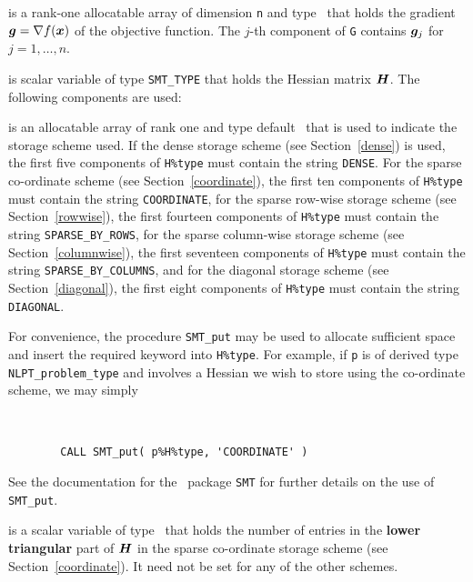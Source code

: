 \documentclass{galahad}
\newcommand{\Grad}{\nabla}
\begin{document}
\begin{description}
\begin{description}
 is a rank-one allocatable array of dimension {\tt n} and type 
\realdp\ that holds the gradient $\bmg = \Grad f(\bmx)$ 
of the objective function.
The $j$-th component of 
{\tt G} contains ${\bm{g}}_{j}$ for $j = 1, \ldots, n$.

\end{description}

 is scalar variable of type {\tt SMT\_TYPE} 
that holds the Hessian matrix ${\bm{H}}$. The following components
are used:

\begin{description}

 is an allocatable array of rank one and type default 
\character\ that
is used to indicate the storage scheme used. If the dense storage scheme 
(see Section~\ref{dense}) is used, 
the first five components of {\tt H\%type} must contain the
string {\tt DENSE}.
For the sparse co-ordinate scheme (see Section~\ref{coordinate}), 
the first ten components of {\tt H\%type} must contain the
string {\tt COORDINATE},  
for the sparse row-wise storage scheme (see Section~\ref{rowwise}),
the first fourteen components of {\tt H\%type} must contain the
string {\tt SPARSE\_BY\_ROWS},
for the sparse column-wise storage scheme (see Section~\ref{columnwise}),
the first seventeen components of {\tt H\%type} must contain the
string {\tt SPARSE\_BY\_COLUMNS},
and for the diagonal storage scheme (see Section~\ref{diagonal}),
the first eight components of {\tt H\%type} must contain the
string {\tt DIAGONAL}.

For convenience, the procedure {\tt SMT\_put} 
may be used to allocate sufficient space and insert the required keyword
into {\tt H\%type}.
For example, if {\tt p} is of derived type {\tt NLPT\_problem\_type}
and involves a Hessian we wish to store using the co-ordinate scheme,
we may simply
{\tt 
\begin{verbatim}
        CALL SMT_put( p%H%type, 'COORDINATE' )
\end{verbatim}
}
\noindent
See the documentation for the \galahad\ package {\tt SMT} 
for further details on the use of {\tt SMT\_put}.

 is a scalar variable of type \integer\ that 
holds the number of entries in the {\bf lower triangular} part of ${\bm{H}}$
in the sparse co-ordinate storage scheme (see Section~\ref{coordinate}). 
It need not be set for any of the other schemes.


\end{description}
\end{description}
\end{document}

